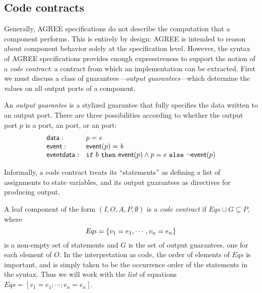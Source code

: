 
\subsection{Code contracts}
\label{code-contracts}

Generally, AGREE specifications do not describe the computation that a
component performs. This is entirely by design: AGREE is intended to
reason about component behavior solely at the specification
level. However, the syntax of AGREE specifications provides enough
expressiveness to support the notion of a \emph{code contract}: a
contract from which an implementation can be extracted. First we must
discuss a class of guarantees---\emph{output guarantees}---which
determine the values on all output ports of a component.

\begin{definition}
An \emph{output guarantee} is a stylized guarantee that fully
specifies the data written to an output port. There are three
possibilities according to whether the output port $p$ is
a  port, an  port, or an 
port:
\[
\begin{array}{ll}
\mathsf{data}: &  p = \mathit{e} \\
\mathsf{event}: &  \mathsf{event} (p) = \mathit{b} \\
\mathsf{event data}: & \mbox{$\mathtt{if}\ {b}\ \mathtt{then}\ {\mathsf{event} (p) \land p = e}\ \mathtt{else}\ {\neg \mathsf{event}(p)}$} \\
\end{array}
\]
\end{definition}

Informally, a code contract treats its  ``statements'' as
defining a list of assignments to state variables, and its output
guarantees as directives for producing output.

\begin{definition} A
  leaf component of the form $(I,O,A,P,\emptyset)$ is a
  \emph{code contract} if $\mathit{Eqs} \cup G \subseteq P$, where
\[\mathit{Eqs} = \{ {v_1 = e_1, \cdots , v_n = e_n} \} \] is a non-empty set
of  statements and $G$ is the set of output guarantees, one for
each element of $O$. In the interpretation as code, the order of
elements of $\mathit{Eqs}$ is important, and is simply taken to be the
occurrence order of the  statements in the syntax. Thus we
will work with the
\emph{list} of equations $\mathit{Eqs} = [v_1 = e_1; \cdots ; v_n = e_n]$.
\end{definition}


